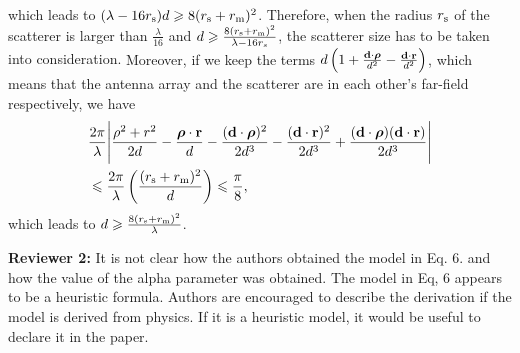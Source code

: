 \documentclass[a4paper,12pt]{article}
\begin{document}
\begin{framed}
{\begin{equation}
        \end{equation}
        which leads to $(\lambda-16r_{\rm s})d \geqslant 8(r_{\rm s}+r_{\rm m})^2 $. Therefore, when the radius $r_{\rm s}$ of the scatterer is larger than $\frac{\lambda}{16}$ and $d\geqslant \frac{8(r_{\rm s}+r_{\rm m})^2}{\lambda-16r_s}$, the scatterer size has to be taken into consideration.} Moreover, if we keep the terms $d \left( 1+\frac{{\bf d}\cdot\boldsymbol{\rho}}{d^2} - \frac{{\bf d}\cdot{\bf r}}{d^2} \right)$, which means that the antenna array and the scatterer are in each other's far-field respectively, we have
        {\color{red}
        \begin{equation}
            \begin{aligned}
        &\frac{2\pi}{\lambda} \Bigg| \frac{\rho^2+r^2}{2d} - \frac{\boldsymbol{\rho}\cdot{\bf r}}{d}- \frac{({\bf d}\cdot\boldsymbol{\rho})^2}{2d^3} - \frac{({\bf d}\cdot{\bf r})^2}{2d^3} + \frac{({\bf d}\cdot\boldsymbol{\rho})({\bf d}\cdot{\bf r})}{2d^3} \Bigg|
        \\& \leqslant \frac{2\pi}{\lambda} \left( \frac{(r_{\rm s}+r_{\rm m})^2}{d} \right) \leqslant \frac{\pi}{8},
            \end{aligned}
        \end{equation}
        which leads to $d\geqslant \frac{8(r_{\rm s}+r_{\rm m})^2}{\lambda}$. 
     }
\end{framed}


\textbf{Reviewer 2:}
It is not clear how the authors obtained the model in Eq. 6. and how the value of the alpha parameter was obtained. The model in Eq, 6 appears to be a heuristic formula. Authors are encouraged to describe the derivation if the model is derived from physics. If it is a heuristic model, it would be useful to declare it in the paper.

{}
\end{document}
